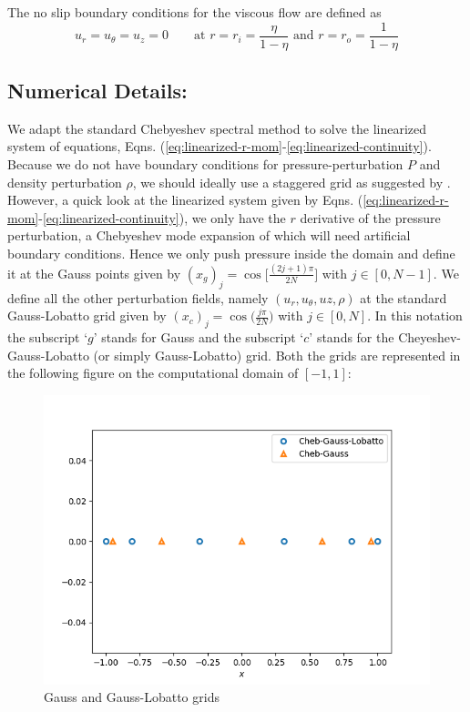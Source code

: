 \documentclass{article}
\begin{document}
The no slip boundary conditions for the viscous flow are defined as 
\begin{equation}
 u_{r} = u_{\theta} = u_{z} = 0 
 \qquad
 \textrm{at } r = r_{i} = \frac{\eta}{1-\eta} \textrm{ and } r = r_{o} = \frac{1}{1-\eta} 
\end{equation}
\subsection*{Numerical Details:}
We adapt the standard Chebyeshev spectral method to solve the linearized system of equations, Eqns. (\ref{eq:linearized-r-mom}-\ref{eq:linearized-continuity}). Because we do not have boundary conditions for pressure-perturbation $P$ and density perturbation $\rho$, we should ideally use a staggered grid as suggested by \cite{khorrami1991chebyshev}. However, a quick look at the linearized system given by Eqns. (\ref{eq:linearized-r-mom}-\ref{eq:linearized-continuity}), we only have the $r$ derivative of the pressure perturbation, a Chebyeshev mode expansion of which will need artificial boundary conditions. Hence we only push pressure inside the domain and define it at the Gauss points given by $(x_{g})_{j} = \cos{\bigg[\frac{(2j + 1)\pi}{2N}\bigg]}$ with $j \in [0, N-1]$. We define all the other perturbation fields, namely $(u_{r}, u_{\theta}, uz, \rho)$ at the standard Gauss-Lobatto grid given by $(x_{c})_{j} = \cos{\bigg(\frac{j\pi}{2N}\bigg)}$ with $j \in [0, N]$. In this notation the subscript `$g$' stands for Gauss and the subscript `$c$' stands for the Cheyeshev-Gauss-Lobatto (or simply Gauss-Lobatto) grid. 
Both the grids are represented in the following figure on the computational domain of $[-1, 1]$:

\begin{figure}[H]
        \centering
    \includegraphics[scale=0.35]{Figs/test_gauss_grid.png}
            \caption{Gauss and Gauss-Lobatto grids}
        \label{fig:grids}
\end{figure}
\end{document}
